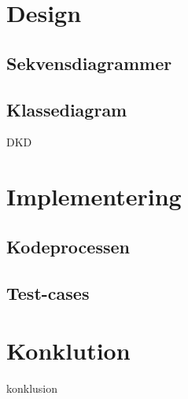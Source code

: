 \documentclass{article}
\begin{document}
{\section{Design}

\subsection{Sekvensdiagrammer}

\subsection{Klassediagram}
{DKD}

\section{Implementering}
\subsection{Kodeprocessen}

\subsection{Test-cases}

\section{Konklution}
{konklusion}
\printbibliography
}
\end{document}
